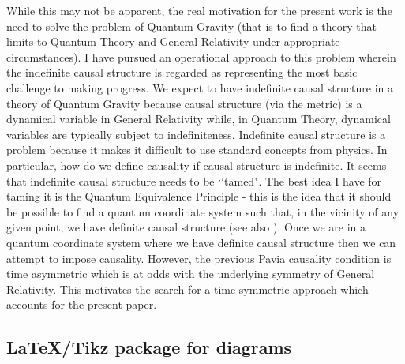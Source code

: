 \documentclass[10pt]{article}
\begin{document}
While this may not be apparent, the real motivation for the present work is the need to solve the problem of Quantum Gravity (that is to find a theory that limits to Quantum Theory and General Relativity under appropriate circumstances).   I have pursued an operational approach to this problem \cite{hardy2005probability, hardy2016operational, hardy2018construction} wherein the indefinite causal structure is regarded as representing the most basic challenge to making progress.  We expect to have indefinite causal structure in a theory of Quantum Gravity because causal structure (via the metric) is a dynamical variable in General Relativity while, in Quantum Theory, dynamical variables are typically subject to indefiniteness.  Indefinite causal structure is a problem because it makes it difficult to use standard concepts from physics.  In particular, how do we define causality if causal structure is indefinite.  It seems that indefinite causal structure needs to be \lq\lq tamed".  The best idea I have for taming it is the Quantum Equivalence Principle - this is the idea that it should be possible to find a quantum coordinate system such that, in the vicinity of any given point, we have definite causal structure \cite{hardy2020implementation} (see also \cite{giacomini2020einstein, marletto2020testability}).  Once we are in a quantum coordinate system where we have definite causal structure then we can attempt to impose causality.  However, the previous Pavia causality condition is time asymmetric which is at odds with the underlying symmetry of General Relativity.  This motivates the search for a time-symmetric approach which accounts for the present paper.


\subsection{LaTeX/Tikz package for diagrams}
\end{document}
